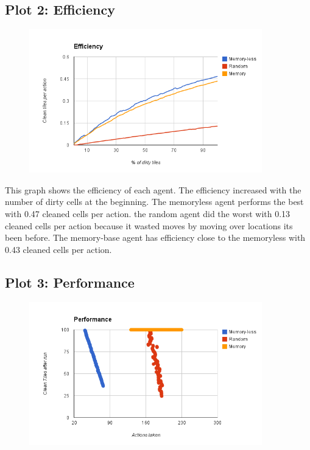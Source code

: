 \documentclass[a4paper,10pt]{article}
\begin{document}
\subsection{Plot 2: Efficiency}
\begin{figure}[H]
	\includegraphics[width=0.9\textwidth]{image1.png}
\end{figure}

This graph shows the efficiency of each agent.
The efficiency increased with the number of dirty cells at the beginning.
The memoryless agent performs the best with 0.47 cleaned cells per action.
the random agent did the worst with 0.13 cleaned cells per action because it wasted moves by moving over locations its been before.
The memory-base agent has efficiency close to the memoryless with 0.43 cleaned cells per action.

\subsection{Plot 3: Performance}
\begin{figure}[H]
	\includegraphics[width=0.9\textwidth]{image2.png}
\end{figure}
\end{document}

